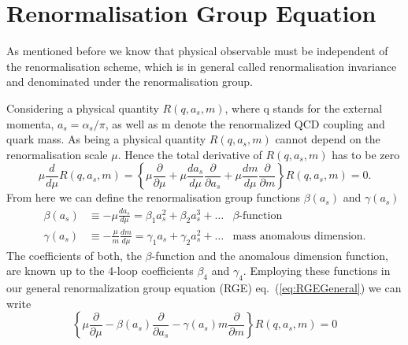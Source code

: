 \section{Renormalisation Group Equation}
As mentioned before we know that physical observable must be independent of the renormalisation scheme, which is in general called renormalisation invariance and denominated under the renormalisation group.
\par
Considering a physical quantity $R(q, a_s, m)$, where q stands for the external momenta, $a_s = \alpha_s/\pi$, as well as m denote the renormalized QCD coupling and quark mass. As being a physical quantity $R(q, a_s, m)$ cannot depend on the renormalisation scale $\mu$. Hence the total derivative of $R(q, a_s, m)$ has to be zero
\begin{equation}
	\label{eq:RGEGeneral}
	\mu \frac{d}{d\mu} R(q, a_s, m) = \left\{ \mu \frac{\partial}{\partial \mu} + \mu \frac{da_s}{d\mu}\frac{\partial}{\partial a_s} + \mu\frac{dm}{d\mu}\frac{\partial}{\partial m}\right\} R(q, a_s, m) = 0.
\end{equation}
From here we can define the renormalisation group functions $\beta(a_s)$ and $\gamma(a_s)$
\begin{align}
	\beta(a_s) &\equiv - \mu\frac{da_s}{d\mu} = \beta_1 a_s^2 + \beta_2 a_s^3 + \ldots & \beta\text{-function} \\
	\gamma(a_s) &\equiv  -\frac{\mu}{m} \frac{dm}{d\mu} = \gamma_1 a_s + \gamma_2 a^2_s + \ldots & \text{mass anomalous dimension}.
\end{align}
The coefficients of both, the $\beta$-function and the anomalous dimension function, are known up to the 4-loop coefficients $\beta_4$ and $\gamma_4$. Employing these functions in our general renormalization group equation (RGE) eq.~(\ref{eq:RGEGeneral}) we can write
\begin{equation}
	\label{eq:RGE}
	\left \{ \mu\frac{\partial}{\partial \mu} - \beta(a_s) \frac{\partial}{\partial a_s} - \gamma(a_s) m\frac{\partial}{\partial m} \right\} R(q, a_s, m) = 0
\end{equation} 


